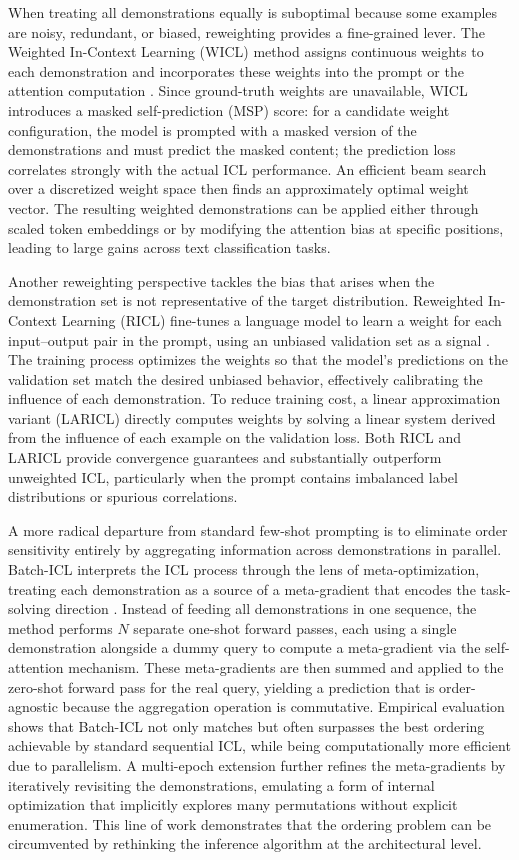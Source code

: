\documentclass[11pt]{article}
\begin{document}
When treating all demonstrations equally is suboptimal because some examples are noisy, redundant, or biased, reweighting provides a fine-grained lever. The Weighted In-Context Learning (WICL) method assigns continuous weights to each demonstration and incorporates these weights into the prompt or the attention computation \cite{ref79}. Since ground-truth weights are unavailable, WICL introduces a masked self-prediction (MSP) score: for a candidate weight configuration, the model is prompted with a masked version of the demonstrations and must predict the masked content; the prediction loss correlates strongly with the actual ICL performance. An efficient beam search over a discretized weight space then finds an approximately optimal weight vector. The resulting weighted demonstrations can be applied either through scaled token embeddings or by modifying the attention bias at specific positions, leading to large gains across text classification tasks.

Another reweighting perspective tackles the bias that arises when the demonstration set is not representative of the target distribution. Reweighted In-Context Learning (RICL) fine-tunes a language model to learn a weight for each input--output pair in the prompt, using an unbiased validation set as a signal \cite{ref80}. The training process optimizes the weights so that the model's predictions on the validation set match the desired unbiased behavior, effectively calibrating the influence of each demonstration. To reduce training cost, a linear approximation variant (LARICL) directly computes weights by solving a linear system derived from the influence of each example on the validation loss. Both RICL and LARICL provide convergence guarantees and substantially outperform unweighted ICL, particularly when the prompt contains imbalanced label distributions or spurious correlations.

A more radical departure from standard few-shot prompting is to eliminate order sensitivity entirely by aggregating information across demonstrations in parallel. Batch-ICL interprets the ICL process through the lens of meta-optimization, treating each demonstration as a source of a meta-gradient that encodes the task-solving direction \cite{ref81}. Instead of feeding all demonstrations in one sequence, the method performs \(N\) separate one-shot forward passes, each using a single demonstration alongside a dummy query to compute a meta-gradient via the self-attention mechanism. These meta-gradients are then summed and applied to the zero-shot forward pass for the real query, yielding a prediction that is order-agnostic because the aggregation operation is commutative. Empirical evaluation shows that Batch-ICL not only matches but often surpasses the best ordering achievable by standard sequential ICL, while being computationally more efficient due to parallelism. A multi-epoch extension further refines the meta-gradients by iteratively revisiting the demonstrations, emulating a form of internal optimization that implicitly explores many permutations without explicit enumeration. This line of work demonstrates that the ordering problem can be circumvented by rethinking the inference algorithm at the architectural level.
\end{document}
